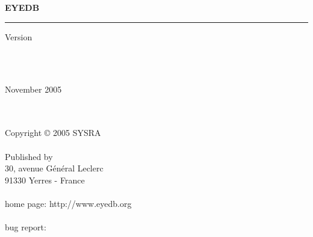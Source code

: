 
\thispagestyle{empty}

\mbox{ }
\\
\vspace{3 cm}
\\
{\bf{\Huge E{\LARGE YE}DB} \hspace{0.cm} {\Huge \mantitle}}
\\
\newcommand{\rulewidth}{15.4cm}
\rule{\rulewidth}{1.6mm}
\begin{flushright}
{\large Version \eyedbversion}
\end{flushright}
\mbox{ }
\\
\vspace{11 cm}
\\
\begin{flushright}
{\large November 2005}
\end{flushright}

\newpage

\thispagestyle{empty}

\mbox{ }
\\
\vspace{1cm}
\\
Copyright {\copyright} 2005 SYSRA
\\
\vspace{1cm}
\\
Published by \sysra
\\
30, avenue G\'en\'eral Leclerc
\\
91330 Yerres - France
\\
\\
home page: http://www.eyedb.org
\\
\\
bug report: \bugreport
